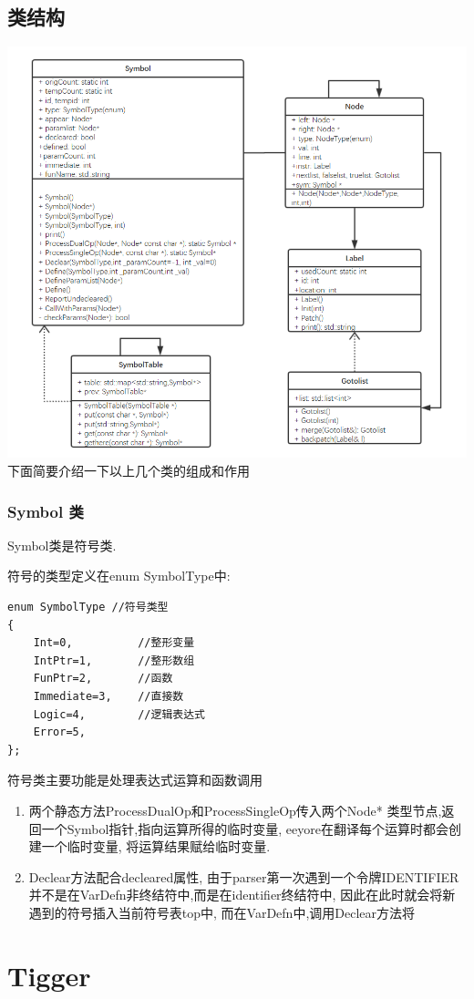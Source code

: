 \documentclass[UTF8]{article}
\begin{document}
\subsection{类结构}
\includegraphics[width=\linewidth]{uml_eeyore} 
下面简要介绍一下以上几个类的组成和作用
\subsubsection{Symbol 类}
Symbol类是符号类.

符号的类型定义在enum SymbolType中:
\begin{lstlisting}
enum SymbolType //符号类型
{
    Int=0,          //整形变量
    IntPtr=1,       //整形数组
    FunPtr=2,       //函数
    Immediate=3,    //直接数
    Logic=4,        //逻辑表达式
    Error=5,        
};
\end{lstlisting}
符号类主要功能是处理表达式运算和函数调用
\begin{enumerate}[(1)]
\item 两个静态方法ProcessDualOp和ProcessSingleOp传入两个Node* 类型节点,返回一个Symbol指针,指向运算所得的临时变量, eeyore在翻译每个运算时都会创建一个临时变量, 将运算结果赋给临时变量.
\item Declear方法配合decleared属性, 由于parser第一次遇到一个令牌IDENTIFIER并不是在VarDefn非终结符中,而是在identifier终结符中, 因此在此时就会将新遇到的符号插入当前符号表top中, 而在VarDefn中,调用Declear方法将
\end{enumerate}
\section{Tigger}
\end{document}
